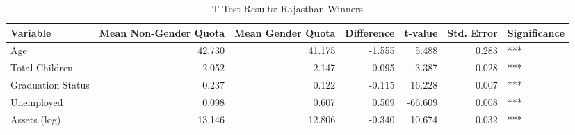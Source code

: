 \begin{table}

\caption{T-Test Results: Rajasthan Winners}
\centering
\begin{tabular}[t]{l|r|r|r|r|r|l}
\hline
\textbf{Variable} & \textbf{Mean Non-Gender Quota} & \textbf{Mean Gender Quota} & \textbf{Difference} & \textbf{t-value} & \textbf{Std. Error} & \textbf{Significance}\\
\hline
Age & 42.730 & 41.175 & -1.555 & 5.488 & 0.283 & ***\\
\hline
Total Children & 2.052 & 2.147 & 0.095 & -3.387 & 0.028 & ***\\
\hline
Graduation Status & 0.237 & 0.122 & -0.115 & 16.228 & 0.007 & ***\\
\hline
Unemployed & 0.098 & 0.607 & 0.509 & -66.609 & 0.008 & ***\\
\hline
Assets (log) & 13.146 & 12.806 & -0.340 & 10.674 & 0.032 & ***\\
\hline
\end{tabular}
\end{table}
